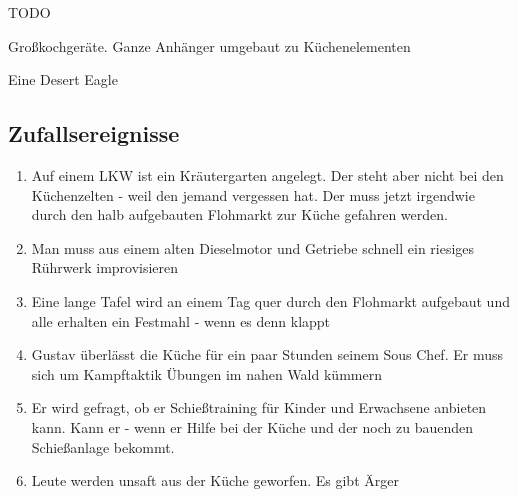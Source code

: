 \begin{npcBox}[title=Gustav Müller]
    \begin{stunts}
    \item {}
    \end{stunts}

    \begin{stressSection}
    \end{stressSection}
    \begin{tabularx}{\textwidth}{ XX }
    \end{tabularx}

    \begin{consequences}
    \item {}
    \item {}
    \item {}
    \end{consequences}

    \begin{npcDescription}
    TODO
    \end{npcDescription}


    \begin{equipment}
    \item Großkochgeräte. Ganze Anhänger umgebaut zu Küchenelementen
    \item Eine Desert Eagle
    \end{equipment}
\end{npcBox}


\subsection{Zufallsereignisse}

\begin{enumerate}
\item Auf einem LKW ist ein Kräutergarten angelegt. Der steht aber nicht bei den Küchenzelten - weil den jemand vergessen hat. Der muss jetzt irgendwie durch den halb aufgebauten Flohmarkt zur Küche gefahren werden.
\item Man muss aus einem alten Dieselmotor und Getriebe schnell ein riesiges Rührwerk improvisieren
\item Eine lange Tafel wird an einem Tag quer durch den Flohmarkt aufgebaut und alle erhalten ein Festmahl - wenn es denn klappt
\item Gustav überlässt die Küche für ein paar Stunden seinem Sous Chef. Er muss sich um Kampftaktik Übungen im nahen Wald kümmern
\item Er wird gefragt, ob er Schießtraining für Kinder und Erwachsene anbieten kann. Kann er - wenn er Hilfe bei der Küche und der noch zu bauenden Schießanlage bekommt.
\item Leute werden unsaft aus der Küche geworfen. Es gibt Ärger
\end{enumerate}

